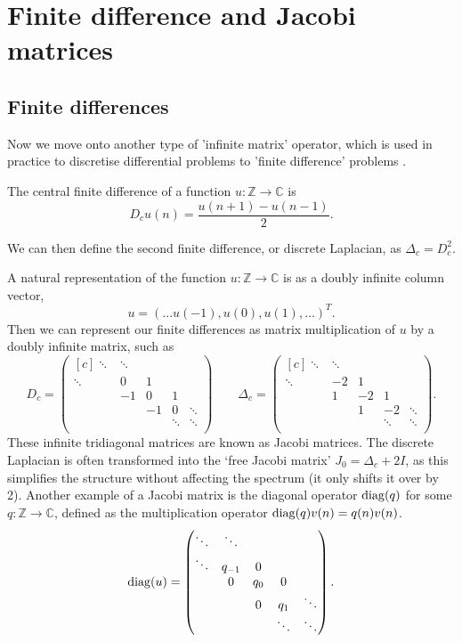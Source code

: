 \documentclass[../main.tex]{subfiles}
\begin{document}
\section{Finite difference and Jacobi matrices}

\subsection{Finite differences}
Now we move onto another type of 'infinite matrix' operator, which is used in
practice to discretise differential problems to 'finite difference' problems 
\cite{suli2003introduction}.

\begin{definition}
  The central finite difference of a function $u: \mathbb{Z} \rightarrow
  \mathbb{C}$ is $$D_c u (n) = \frac{u(n+1) - u(n-1)}{2}.$$

  We can then define the second finite difference, or discrete Laplacian, as
  $\Delta_c = D_c^2$.
\end{definition}

A natural representation of the function $u: \mathbb{Z} \rightarrow \mathbb{C}$
is as a doubly infinite column vector, $$u = (\hdots u(-1), u(0), u(1),\hdots)^T.$$
Then we can represent our finite differences as matrix multiplication of $u$
by a doubly infinite matrix, such as
  $$ 
  D_c = 
  \begin{pmatrix*}[c]
    \ddots & \ddots & & & \\
    \ddots & 0 & 1 & & \\
    & -1 & 0 & 1 & \\
    & & -1 & 0 & \ddots \\
    & & & \ddots & \ddots \\
  \end{pmatrix*}
  \quad\quad
  \Delta_c = 
  \begin{pmatrix*}[c] 
    \ddots & \ddots & & & \\
    \ddots & -2 & 1 & & \\
    & 1 & -2 & 1 & \\
    & & 1 & -2 & \ddots \\
    & & & \ddots & \ddots \\
  \end{pmatrix*}. 
  $$
These infinite tridiagonal matrices are known as Jacobi matrices. The discrete
Laplacian is often transformed into the `free Jacobi matrix' $J_0 = \Delta_c +
2I$, as this simplifies the structure without affecting the spectrum (it only
shifts it over by 2). Another example of a Jacobi matrix is the diagonal
operator $\mathrm{diag}(q)$ for some $q: \mathbb{Z} \rightarrow \mathbb{C}$, defined as
the multiplication operator $\mathrm{diag}(q)v(n) = q(n)v(n)$.
  $$ 
  \diag(u) = 
  \begin{pmatrix*}[c]
    \ddots & \ddots & & & \\
    \ddots & q_{-1} & 0 & & \\
    & 0 & q_0 & 0 & \\
    & & 0 & q_1 & \ddots \\
    & & & \ddots & \ddots \\
  \end{pmatrix*}.
  $$
\end{document}
